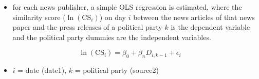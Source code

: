 \documentclass[
]{article}
\providecommand{\tightlist}{%
  \setlength{\itemsep}{0pt}\setlength{\parskip}{0pt}}
\begin{document}
\begin{itemize}
\tightlist
\item
  for each news publisher, a simple OLS regression is estimated, where
  the similarity score (\(\ln(\text{CS}_{i})\)) on day \(i\) between the
  news articles of that news paper and the press releases of a political
  party \(k\) is the dependent variable and the political party dummies
  are the independent variables.
\end{itemize}

\[
\ln(\text{CS}_{i})=\beta_0+\beta_nD_{i,k-1}+\epsilon_i
\]

\begin{itemize}
\tightlist
\item
  \(i\) = date (date1), \(k\) = political party (source2)
\end{itemize}
\end{document}
